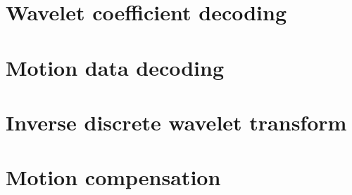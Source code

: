

\clearpage
\section{Wavelet coefficient decoding}

\clearpage
\section{Motion data decoding}

\clearpage
\section{Inverse discrete wavelet transform}

\clearpage
\section{Motion compensation}
